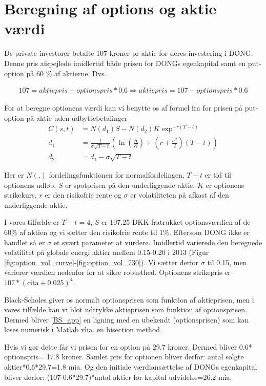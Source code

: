 \documentclass{article}
\begin{document}
\section{Beregning af options og aktie værdi}

De private investorer betalte 107 kroner pr aktie for deres investering i DONG. Denne pris afspejlede imidlertid både prisen for DONGs egenkapital samt en put-option på 60 \% af aktierne. Dvs.

\begin{align}
107=aktiepris+optionspris*0.6 \Rightarrow aktiepris= 107-optionspris*0.6
\end{align}

For at beregne optionens værdi kan vi benytte os af formel fra  \cite{Black1973} for prisen på put-option på aktie uden udbyttebetalinger-
\begin{align}
C(s,t)&=N(d_1)S-N(d_2)K \exp^{-r(T-t)} \\
d_1&= \frac{1}{\sigma\sqrt{T-t}}\left( \ln\left( \frac{S}{K} \right)+\left(r+\frac{\sigma^2}{2} \right)(T-t) \right) \nonumber \\
d_2&=d_1-\sigma \sqrt{T-t} \nonumber \label{BS_app}
\end{align}

Her er $N(.)$ fordelingsfunktionen for normalfordelingen, $T-t$ er tid til optionens udløb, $S$ er spotprisen på den underliggende aktie, $K$ er optionens strikekurs, $r$ er den risikofrie rente og $\sigma$ er volatiliteten på afkast af den underliggende aktie. 

I vores tilfælde er $T-t=4$, $S$ er 107.25 DKK fratrukket optionsværdien af de 60\% af aktien og vi sætter den risikofrie rente til 1\%. Eftersom DONG ikke er handlet så er $\sigma$ et svært parameter at vurdere. Imidlertid varierede den  beregnede volatilitet på globale energi aktier mellem 0.15-0.20 i 2013 (Figur \ref{fig:option_vol_curve}-\ref{fig:option_vol_730}). Vi sætter derfor $\sigma$ til 0.15, men varierer værdien nedenfor for at sikre robusthed. Optionens strikepris er $107*(\mathrm{cita}+0.025)^4$.

Black-Scholes giver os normalt optionsprisen som funktion af aktieprisen, men i vores tilfælde kan vi blot udtrykke aktieprisen som funktion af optionsprisen. Dermed bliver \eqref{BS_app} en ligning med en ubekendt (optionsprisen) som kan løses numerisk i Matlab vha. en bisection method.

Hvis vi gør dette får vi prisen for en option på 29.7 kroner. Dermed bliver 0.6* optionspris= 17.8 kroner. 
Samlet pris for optionen bliver derfor: antal solgte aktier*0.6*29.7=1.8 mia.  Og den initiale værdiansættelse af DONGs egenkapital bliver derfor: (107-0.6*29.7)*antal aktier før kapital udvidelse=26.2 mia. 
\end{document}
